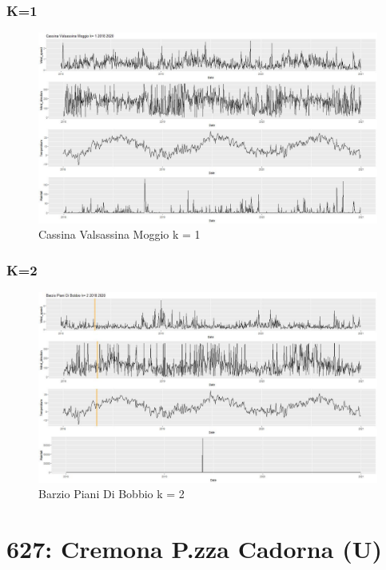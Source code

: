 \documentclass{article}
\begin{document}
\subsubsection{K=1}
\begin{figure}[H]
  \centering 
  \includegraphics[scale = 0.3]{Picture/1/Cassina Valsassina Moggio k= 1 2018 2020 .jpeg}
  \caption{Cassina Valsassina Moggio k = 1 }
  \centering
\end{figure}
\subsubsection{K=2}
\begin{figure}[H]
  \centering 
  \includegraphics[scale = 0.3]{Picture/2/Barzio Piani Di Bobbio k= 2 2018 2020 .jpeg}
  \caption{Barzio Piani Di Bobbio k = 2}
  \centering
\end{figure}

\section{627: Cremona P.zza Cadorna (U)}
\end{document}
